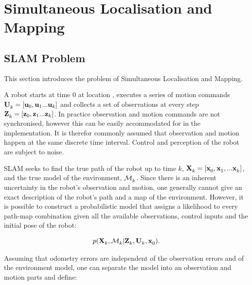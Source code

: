 \section{Simultaneous Localisation and Mapping}
\label{sec:SLAM}

\subsection{SLAM Problem}

This section introduces the problem of Simultaneous Localisation and
Mapping.

A robot starts at time 0 at location , executes a series of
motion commands ${\bf U}^{}_{k} = [{\bf u}_{0},{\bf u}_{1}...{\bf u}_{k}]$ and collects a
set of observations at every step
${\bf Z}^{}_{k}=[{\bf z}_{0},{\bf z}_{1}...{\bf z}_{k}]$. In practice observation and motion
commands are not synchronised, however this can be easily accommodated
for in the implementation. It is therefor commonly assumed that
observation and motion happen at the same discrete time interval.
Control and perception of the robot are subject to noise.



SLAM seeks to find the true path of the robot up to time $k$,
$\Xall{k}{}{} = [\x{0}{}{}, \x{1}{}{}, ... \x{k}{}{}]$, and the true
model of the environment, $\map{k}{}{}$. Since there is an inherent
uncertainty in the robot's observation and motion, one generally
cannot give an exact description of the robot's path and a map of the
environment. However, it is possible to construct a probabilistic
model that assigns a likelihood to every path-map combination given
all the available observations, control inputs and the initial pose of
the robot:

\begin{equation}
 p(\Xall{k}{}{}, \map{k}{}{} | \Zall{k}{}, \Uall{k}{}, \x{0}{}{}).
\label{eqn:map}
\end{equation}

Assuming that odometry errors are independent of the observation
errors and of the environment model, one can separate the model into
an observation and motion parts and define:

